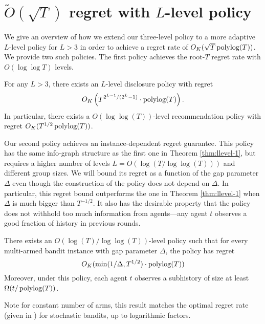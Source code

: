 
\section{$\tilde O(\sqrt{T})$ regret with $L$-level policy}
\label{sec:llevel}

We give an overview of how we extend our three-level
policy to a more adaptive $L$-level policy for $L > 3$ in order to
achieve a regret rate of $O_K(\sqrt{T} \polylog(T))$. We provide two
such policies. The first policy achieves the root-$T$ regret rate with
$O(\log \log T)$ levels.

\begin{theorem}
\label{thm:llevel-1}
For any $L > 3$, there exists an $L$-level disclosure policy with
regret $$O_K\left(T^{2^{L-1}/(2^L-1)} \cdot \polylog(T) \right).$$ In
particular, there exists a $O(\log\log(T))$-level recommendation
policy with regret $O_K(T^{1/2} \polylog(T))$.
\end{theorem}

Our second policy achieves an instance-dependent regret
guarantee. This policy has the same info-graph structure as the first
one in Theorem \ref{thm:llevel-1}, but requires a higher number of
levels $L = O(\log(T/\log\log(T)))$ and different group sizes. We will
bound its regret as a function of the gap parameter $\Delta$ even
though the construction of the policy does not depend on $\Delta$. In
particular, this regret bound outperforms the one in Theorem
\ref{thm:llevel-1} when $\Delta$ is much bigger than $T^{-1/2}$.  It
also has the desirable property that the policy does not withhold too
much information from agents---any agent $t$ observes a good fraction
of history in previous rounds.

\begin{theorem}
\label{thm:llevel-2}
There exists an $O(\log(T)/\log\log(T))$-level policy such that for
every multi-armed bandit instance with gap parameter $\Delta$, the
policy has regret $$O_K(\min(1/\Delta, T^{1/2}) \cdot \polylog(T))$$
Moreover, under this policy, each agent $t$ observes a subhistory of
size at least $\Omega( t/\polylog(T))$.
\end{theorem}

Note for constant number of arms, this result matches the optimal
regret rate (given in ) for stochastic
bandits, up to logarithmic factors.


